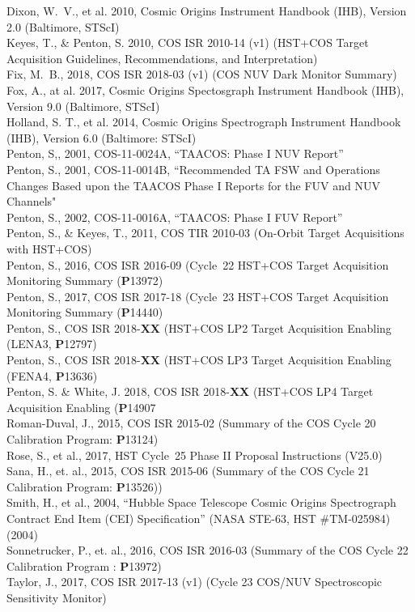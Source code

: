 \documentclass{stsci_report}
\newcommand{\pid}[1]{{\bf P}#1}
\begin{document}
\small
Dixon, W.~V., et al. 2010, Cosmic Origins Instrument Handbook (IHB), Version 2.0 (Baltimore, STScI)\\
Keyes, T., \& Penton, S. 2010, COS ISR 2010-14 (v1) (HST+COS Target Acquisition Guidelines, Recommendations, and Interpretation)\\
Fix, M.~B., 2018, COS ISR 2018-03 (v1) (COS NUV Dark Monitor Summary)\\
Fox, A., at al. 2017, Cosmic Origins Spectosgraph Instrument Handbook (IHB), Version 9.0 (Baltimore, STScI)\\
Holland, S. T., et al. 2014, Cosmic Origins Spectrograph Instrument Handbook (IHB), Version 6.0 (Baltimore: STScI)\\
Penton, S,, 2001, COS-11-0024A, ``TAACOS: Phase I NUV Report''\\
Penton, S., 2001, COS-11-0014B, ``Recommended TA FSW and Operations Changes Based upon the TAACOS Phase I Reports for the FUV and NUV Channels"\\
Penton, S., 2002, COS-11-0016A, ``TAACOS: Phase I FUV Report''\\
Penton, S., \& Keyes, T., 2011, COS TIR 2010-03 (On-Orbit Target Acquisitions with HST+COS)\\
Penton, S., 2016, COS ISR 2016-09 (Cycle~22 HST+COS Target Acquisition Monitoring Summary (\pid{13972})\\
Penton, S., 2017, COS ISR 2017-18 (Cycle~23 HST+COS Target Acquisition Monitoring Summary (\pid{14440})\\
Penton, S., COS ISR 2018-{\bf XX} (HST+COS LP2 Target Acquisition Enabling (LENA3, \pid{12797})\\
Penton, S., COS ISR 2018-{\bf XX} (HST+COS LP3 Target Acquisition Enabling (FENA4, \pid{13636})\\
Penton, S. \& White, J. 2018, COS ISR 2018-{\bf XX} (HST+COS LP4 Target Acquisition Enabling (\pid{14907}\\
Roman-Duval, J., 2015, COS ISR 2015-02 (Summary of the COS Cycle 20 Calibration Program: \pid{13124})\\
Rose, S., et al., 2017, HST Cycle~25 Phase II Proposal Instructions (V25.0)\\
Sana, H., et. al., 2015, COS ISR 2015-06 (Summary of the COS Cycle 21 Calibration Program: \pid{13526}))\\
Smith, H., et al., 2004, ``Hubble Space Telescope Cosmic Origins Spectrograph Contract End Item (CEI) Specification'' (NASA STE-63, HST \#TM-025984) (2004)\\
Sonnetrucker, P., et. al., 2016, COS ISR 2016-03 (Summary of the COS Cycle 22 Calibration Program : \pid{13972}) \\
Taylor, J., 2017, COS ISR 2017-13 (v1) (Cycle 23 COS/NUV Spectroscopic Sensitivity Monitor)\\
\normalsize
\newpage
\clearpage
\end{document}
